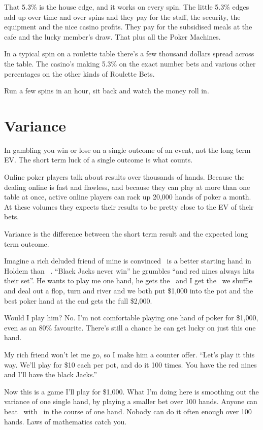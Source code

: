 That 5.3\% is the house edge, and it works on every spin. The little 5.3\%
edges add up over time and over spins and they pay for the staff, the
security, the equipment and the nice casino profits. They pay for the
subsidised meals at the cafe and the lucky member's draw. That plus
all the Poker Machines.

In a typical spin on a roulette table there's a few thousand dollars
spread across the table. The casino's making 5.3\% on the exact number
bets and various other percentages on the other kinds of Roulette Bets.

Run a few spins in an hour, sit back and watch the money roll in.

\section{Variance}

In gambling you win or lose on a single outcome of an event,
not the long term EV. The short term luck of a single outcome
is what counts.

Online poker players talk about results over thousands of hands. Because the
dealing online is fast and flawless, and because they can play at
more than one table at once, active online players can rack up
20,000 hands of poker a month. At these volumes they expects their
results to be pretty close to the EV of their bets.

Variance is the difference between the short term result and the
expected long term outcome.

Imagine a rich deluded friend of mine is convinced \nineh\nined\ is a better
starting hand in Holdem than \Jc\Js\ . ``Black Jacks never win'' he grumbles
``and red nines always hits their set''. He wants to play me one hand, he
gets the \nineh\nined\ and I get the \Jc\Js\, we shuffle and deal out a flop,
turn and river and we both put \$1,000 into the pot and the best
poker hand at the end gets the full \$2,000.

Would I play him? No. I'm not comfortable playing one hand of poker
for \$1,000, even as an 80\% favourite. There's still a chance he can get
lucky on just this one hand.

My rich friend won't let me go, so I make him a counter offer.
``Let's play it this way. We'll play for \$10 each per pot, and do
it 100 times. You have the red nines and I'll have the black Jacks.''

Now this is a game I'll play for \$1,000. What I'm doing here is smoothing
out the variance of one single hand, by playing a smaller bet over
100 hands. Anyone can beat \Jc\Js\ with \nineh\nined\ in the course of one
hand. Nobody can do it often enough over 100 hands. Laws of mathematics
catch you.

